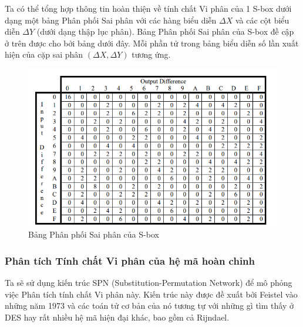 Ta có thể tổng hợp thông tin hoàn thiện về tính chất Vi phân của 1 S-box dưới dạng một bảng Phân phối Sai phân với các hàng biểu diễn $\Delta X$ và các cột biểu diễn $\Delta Y$ (dưới dạng thập lục phân). Bảng Phân phối Sai phân của S-box đề cập ở trên được cho bởi bảng dưới đây. Mỗi phần tử trong bảng biểu diễn số lần xuất hiện của cặp sai phân $(\Delta X, \Delta Y)$ tương ứng. 
\begin{figure}[H]
    \centering
    \includegraphics[scale=0.9]{Các công cụ và kĩ thuật sử dụng trong tấn công/diff distribution table.png}
    
    \caption{Bảng Phân phối Sai phân của S-box}
\end{figure}
\subsubsection{Phân tích Tính chất Vi phân của hệ mã hoàn chỉnh}
Ta sẽ sử dụng kiến trúc SPN (Substitution-Permutation Network) để mô phỏng việc Phân tích tính chất Vi phân này. Kiến trúc này được đề xuất bởi Feistel vào những năm 1973 và các toán tử cơ bản của nó tương tự với những gì tìm thấy ở DES hay rất nhiều hệ mã hiện đại khác, bao gồm cả Rijndael.

